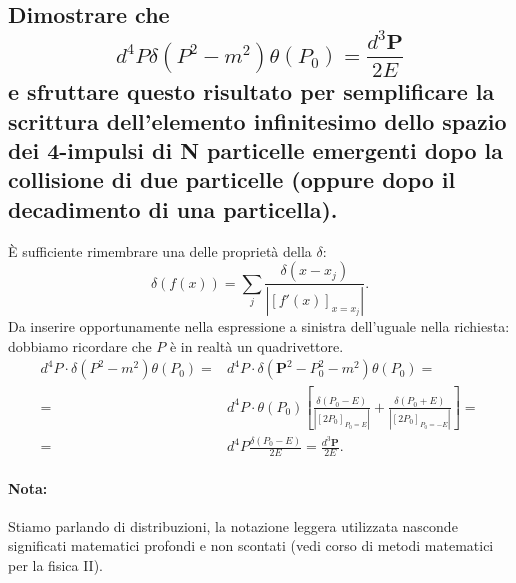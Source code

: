\subsection[]{Dimostrare che 
\[
d^{4}P \delta\left( P^2-m^2 \right) \theta\left( P_0 \right) = \frac{d^3 \boldsymbol{P} }{2E}
\]
e sfruttare questo risultato per semplificare la scrittura dell’elemento infinitesimo dello spazio dei 4-impulsi di N particelle emergenti dopo la collisione di due particelle (oppure dopo il decadimento di una particella).}
È sufficiente rimembrare una delle proprietà della $\delta$:
\[
	\delta\left( f\left( x \right)  \right) = \sum_{j} \frac{\delta\left( x-x_j \right) }{\left| \left[ f'\left( x \right)  \right]_{x = x_j} \right| }
.\] 
Da inserire opportunamente nella espressione a sinistra dell'uguale nella richiesta: dobbiamo ricordare che $P$ è in realtà un quadrivettore.
\begin{align*}
	d^{4}P \cdot \delta\left( P^2-m^2 \right) \theta\left( P_0 \right) =& d^4P\cdot  \delta\left(\boldsymbol{P}^2 - P_0^2 - m^2 \right) \theta\left( P_0 \right)  = \\
	=& d^4 P \cdot  \theta\left( P_0 \right) \left[ \frac{\delta\left( P_0 - E \right) }{\left| \left[ 2P_0 \right]_{P_0 = E} \right| } + 
		\frac{\delta\left( P_0 + E \right) }{\left| \left[ 2P_0 \right]_{P_0 = -E}  \right| } \right] =\\
		=& d^4P \frac{\delta\left( P_0 - E \right)}{2E} = \frac{d^3 \boldsymbol{P}}{2E}   
.\end{align*}
\paragraph{Nota:}%
Stiamo parlando di distribuzioni, la notazione leggera utilizzata nasconde significati matematici profondi e non scontati (vedi corso di metodi matematici per la fisica II).

